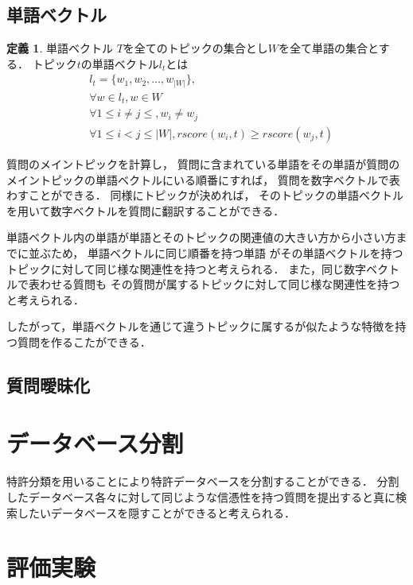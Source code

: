 \documentclass[master]{suribt}
\theoremstyle{definition}
\newtheorem{defi}[thm]{定義}
\begin{document}
 \section{単語ベクトル}
 
 \begin{defi}{単語ベクトル}
  $T$を全てのトピックの集合とし$W$を全て単語の集合とする．
  トピック$t$の単語ベクトル$l_t$とは
  \begin{equation}
  \begin{aligned}
   & l_t  = \{w_1,w_2, \dots , w_{|W|}\}, \\
   & \forall w \in l_t, w \in W \\
   & \forall  1 \leq i \neq j \leq, w_i \neq w_j \\
   & \forall 1 \leq i < j \leq |W|,rscore(w_i,t) \geq rscore(w_j,t) 
  \end{aligned}
  \end{equation}
 \end{defi}
 質問のメイントピックを計算し，
 質問に含まれている単語をその単語が質問のメイントピックの単語ベクトルにいる順番にすれば，
 質問を数字ベクトルで表わすことができる．
 同様にトピックが決めれば，
 そのトピックの単語ベクトルを用いて数字ベクトルを質問に翻訳することができる．
 
 単語ベクトル内の単語が単語とそのトピックの関連値の大きい方から小さい方までに並ぶため，
 単語ベクトルに同じ順番を持つ単語
 がその単語ベクトルを持つトピックに対して同じ様な関連性を持つと考えられる．
 また，同じ数字ベクトルで表わせる質問も
 その質問が属するトピックに対して同じ様な関連性を持つと考えられる．
 
 したがって，単語ベクトルを通じて違うトピックに属するが似たような特徴を持つ質問を作るこたができる．
 
 
 \section{質問曖昧化}
 
 \chapter{データベース分割}
 特許分類を用いることにより特許データベースを分割することができる．
 分割したデータベース各々に対して同じような信憑性を持つ質問を提出すると真に検索したいデータベースを隠すことができると考えられる．

 \chapter{評価実験}
\end{document}

